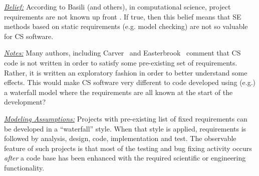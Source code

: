 \documentclass[sigconf,review,anonymous]{acmart}
\begin{document}
\noindent \textit{\underline{Belief:}} According to Basili (and others), in computational science,
project requirements are not known up front \cite{segal08_ss, carver07_environment, segal05_ss, basili08_hpc, easterbrook_cs}.
If true, then this belief means that SE methods based on 
static requirements (e.g. model checking) are not so valuable
for CS software.



\noindent \textit{\underline{Notes:}} 
Many authors, including Carver~\cite{carver07_environment}
and Easterbrook~\cite{easterbrook_cs}
comment that CS code is not written in order
to satisfy some pre-existing set of requirements.
Rather, it is written an exploratory fashion in order
to better understand some effects. 
This would make CS software very different to code developed using (e.g.) a waterfall model where the requirements
are all known at the start of the development?






\noindent \textit{\underline{Modeling Assumptions:}} 
Projects with pre-existing list of fixed requirements 
can be developed in a ``waterfall'' style.
When that style is applied,
requirements is followed by analysis,
design, code, implementation and test.
The observable feature of such projects
is that most of the testing and bug fixing
activity occurs {\em after} a code base
has been enhanced with the required
scientific or engineering functionality.
\end{document}
